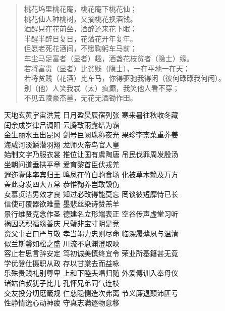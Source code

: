 \documentclass{article}
\begin{document}
\renewcommand\title[1]{\par\vspace*{1ex}\centering{\large#1}\par}
\renewcommand\author[1]{\centering{\footnotesize#1}}
\title{桃花庵歌}
\author{唐伯虎\quad明}
\begin{verse}
桃花坞里桃花庵，桃花庵下桃花仙；\\
桃花仙人种桃树，又摘桃花换酒钱。\\
酒醒只在花前坐，酒醉还来花下眠；\\
半醒半醉日复日，花落花开年复年。\\
但愿老死花酒间，不愿鞠躬车马前；\\
车尘马足富者（显者）趣，酒盏花枝贫者（隐士）缘。\\
若将富贵（显者）比贫贱（隐士），一在平地一在天；\\
若将贫贱（花酒）比车马，你得驱驰我得闲（彼何碌碌我何闲）。\\
别（他）人笑我忒（太）疯癫，我笑他人看不穿；\\
不见五陵豪杰墓，无花无酒锄作田。\\
\end{verse}

\title{千字文}
\noindent
天地玄黄宇宙洪荒 日月盈昃辰宿列张 寒来暑往秋收冬藏\\
闰余成岁律吕调阳 云腾致雨露结为霜\\
金生丽水玉出昆冈 剑号巨阙珠称夜光 果珍李柰菜重芥姜 \\
海咸河淡鳞潜羽翔 龙师火帝鸟官人皇\\
始制文字乃服衣裳 推位让国有虞陶唐 吊民伐罪周发殷汤\\
坐朝问道垂拱平章 爱育黎首臣伏戎羌\\
遐迩壹体率宾归王 鸣凤在竹白驹食场 化被草木赖及万方\\
盖此身发四大五常 恭惟鞠养岂敢毁伤\\
女慕贞洁男效才良 知过必改得能莫忘 罔谈彼短靡恃已长\\
信使可覆器欲难量 墨悲丝染诗赞羔羊\\

\noindent
景行维贤克念作圣 德建名立形端表正 空谷传声虚堂习听\\
祸因恶积福缘善庆 尺璧非宝寸阴是竞\\
资父事君曰严与敬 孝当竭力忠则尽命 临深履薄夙与温清\\
似兰斯馨如松之盛 川流不息渊澄取映\\
容止若思言辞安定 笃初诚美慎终宜令 荣业所基籍甚无竟\\
学优登仕摄职从政 存以甘棠去而益咏\\
乐殊贵贱礼别尊卑 上和下睦夫唱归随 外爱傅训入奉母仪\\
诸姑伯叔犹子比儿 孔怀兄弟同气连枝\\
交友投分切磨箴规 仁慈隐恻造次弗离 节义廉退颠沛匪亏\\
性静情逸心动神疲 守真志满逐物意移\\
\end{document}
